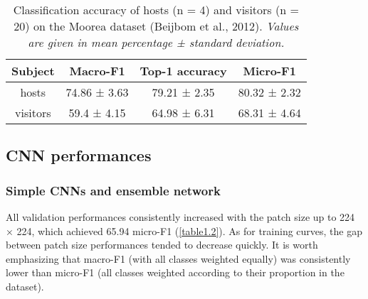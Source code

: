 \begin{table}[htbp]
  \centering
  \normalsize
  \caption[Classification accuracy of hosts (n = 4) and visitors (n = 20) on the Moorea dataset]{Classification accuracy of hosts (n = 4) and visitors (n = 20) on the Moorea dataset (Beijbom et al., 2012). \textit{Values are given in mean percentage ± standard deviation.}}
  \label{table1.1}
    \begin{tabular}{*{4}{c}}
        \toprule
        \textbf{Subject} & \textbf{Macro-F1} & \textbf{Top-1 accuracy} & \textbf{Micro-F1} \\ \midrule
        hosts            & 74.86 ± 3.63      & 79.21 ± 2.35            & 80.32 ± 2.32      \\
        visitors         & 59.4 ± 4.15       & 64.98 ± 6.31            & 68.31 ± 4.64      \\ \bottomrule
    \end{tabular}
\end{table}

\subsection{CNN performances}\label{chapitre1_6.2}

\subsubsection{Simple CNNs and ensemble network}\label{chapitre1_6.2.1}
All validation performances consistently increased with the patch size up to 224 × 224, which achieved 65.94 micro-F1 (\autoref{table1.2}). As for training curves, the gap between patch size performances tended to decrease quickly. It is worth emphasizing that macro-F1 (with all classes weighted equally) was consistently lower than micro-F1 (all classes weighted according to their proportion in the dataset).

